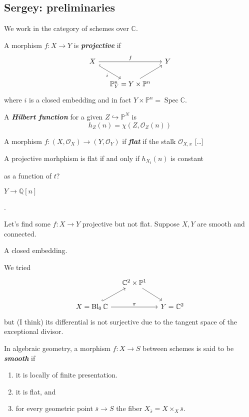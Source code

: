\documentclass{article}
\numberwithin{equation}{section}
\newcommand{\C}{\mathbb{C}}
\newcommand{\Q}{\mathbb{Q}}
\renewcommand{\P}{\mathbb{P}}
\newcommand{\Oc}{\mathcal{O}}
\DeclareMathOperator{\Bl}{Bl}
\DeclareMathOperator{\Spec}{Spec}
\begin{document}
\subsection{Sergey: preliminaries}
We work in the category of schemes over $\C$.
\begin{defn}
	A morphism $f:X\to Y$ is \textbf{\textit{projective}} if
	\[\begin{tikzcd}[column sep=small]
		X\arrow[rr,"f"]\arrow[dr,hook,"i",swap]&&Y\\
		&\P^n_Y=Y\times\P^n\arrow[ur]
	\end{tikzcd}\]
	where $i$ is a closed embedding and in fact $Y\times\P^n=\Spec\C$.
\end{defn}
\begin{defn}
	A \textbf{\textit{Hilbert function}} for a given $Z\hookrightarrow\P^N$ is
	\[h_Z(n)=\chi(Z,\Oc_Z(n))\]
\end{defn}
\begin{defn}
	A morphism $f:(X,\Oc_X)\to(Y,\Oc_Y)$ if \textbf{\textit{flat}} if the stalk $\Oc_{X,x}$ {\color{magenta}[…]}
\end{defn}
\begin{claim}
	A projective morhphism is flat if and only if $h_{X_t}(n)$ is constant {\color{magenta}as a function of $t$?
		
	$Y\to\Q[n]$}.
\end{claim}
\begin{example}
	Let's find some $f:X\to Y$ projective but not flat. Suppose $X,Y$ are smooth and connected.
	
	A closed embedding.
		
		We tried
		\[\begin{tikzcd}[column sep=small]
			&\C^2\times\P^1\arrow[dr]\\
			X=\Bl_0\C\arrow[ur,hook]\arrow[rr,"\pi"]&&Y=\C^2
		\end{tikzcd}\]
		but {\color{magenta}(I think)} its differential is not surjective due to the tangent space of the exceptional divisor.
		
\begin{defn}
	In algebraic geometry, a morphism $f:X\to S$ between schemes is said to be \textbf{\textit{smooth}} if
	\begin{enumerate}
		\item it is locally of finite presentation.
		\item it is flat, and
		\item for every geometric point $\bar{s}\to S$ the fiber $X_{\bar{s}}=X\times_X\bar{s}$.
	\end{enumerate}
\end{defn}
	
	
	
\end{example}
\end{document}
